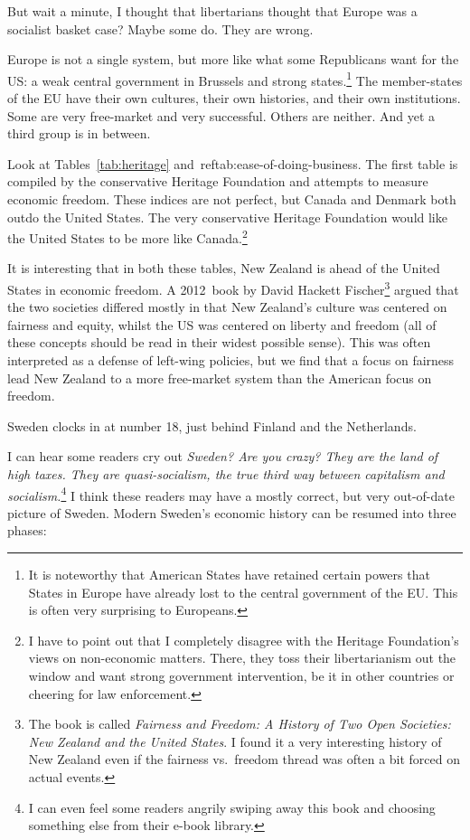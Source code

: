 But wait a minute, I thought that libertarians thought that Europe was a
socialist basket case? Maybe some do. They are wrong.

Europe is not a single system, but more like what some Republicans want for the
US: a weak central government in Brussels and strong states.\footnote{It is
noteworthy that American States have retained certain powers that States in
Europe have already lost to the central government of the EU. This is often
very surprising to Europeans.} The member-states of the EU have their own
cultures, their own histories, and their own institutions. Some are very
free-market and very successful. Others are neither. And yet a third group is
in between.

Look at Tables~\ref{tab:heritage} and~ref{tab:ease-of-doing-business}. The
first table is compiled by the conservative Heritage Foundation and attempts to
measure economic freedom. These indices are not perfect, but Canada and Denmark
both outdo the United States. The very conservative Heritage Foundation would
like the United States to be more like Canada.\footnote{I have to point out
that I completely disagree with the Heritage Foundation's views on non-economic
matters. There, they toss their libertarianism out the window and want strong
government intervention, be it in other countries or cheering for law
enforcement.}

It is interesting that in both these tables, New Zealand is ahead of the United
States in economic freedom. A 2012~book by David Hackett Fischer\footnote{The
book is called \emph{Fairness and Freedom: A History of Two Open Societies: New
Zealand and the United States}. I found it a very interesting history of New
Zealand even if the fairness vs.\ freedom thread was often a bit forced on
actual events.} argued that the two societies differed mostly in that New
Zealand's culture was centered on fairness and equity, whilst the US was
centered on liberty and freedom (all of these concepts should be read in their
widest possible sense). This was often interpreted as a defense of left-wing
policies, but we find that a focus on fairness lead New Zealand to a more
free-market system than the American focus on freedom.

Sweden clocks in at number 18, just behind Finland and the Netherlands.

I can hear some readers cry out \emph{Sweden? Are you crazy? They are the land
of high taxes. They are quasi-socialism, the true third way between capitalism
and socialism.}\footnote{I can even feel some readers angrily swiping away this
book and choosing something else from their e-book library.} I think these
readers may have a mostly correct, but very out-of-date picture of Sweden.
Modern Sweden's economic history can be resumed into three phases:

